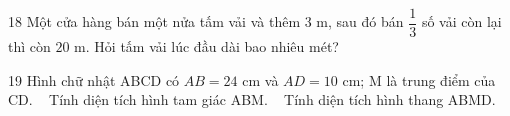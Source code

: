 \gap
\begin{probbox}{18}{}
Một cửa hàng bán một nửa tấm vải và thêm $3$ m, sau đó bán $\dfrac13$ số vải còn lại thì còn $20$ m. Hỏi tấm vải lúc đầu dài bao nhiêu mét?
\end{probbox}
\gap
\begin{probbox}{19}{}
Hình chữ nhật ABCD có $AB=24$ cm và $AD=10$ cm; M là trung điểm của CD. \  Tính diện tích hình tam giác ABM. \  Tính diện tích hình thang ABMD.
\end{probbox}
